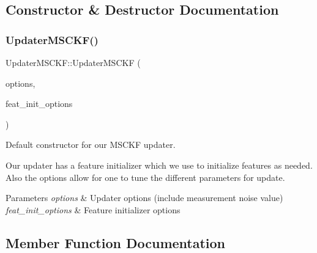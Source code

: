 \subsection{Constructor \& Destructor Documentation}
\mbox{\label{classov__msckf_1_1UpdaterMSCKF_af8d2ffc21b0209319c7fd9a351b9d3ad}} 
\subsubsection{\texorpdfstring{Updater\+M\+S\+C\+K\+F()}{UpdaterMSCKF()}}
{\footnotesize\ttfamily Updater\+M\+S\+C\+K\+F\+::\+Updater\+M\+S\+C\+KF (\begin{DoxyParamCaption}\item[{\hyperlink{structov__msckf_1_1UpdaterOptions}{Updater\+Options} \&}]{options,  }\item[{\hyperlink{structov__core_1_1FeatureInitializerOptions}{ov\+\_\+core\+::\+Feature\+Initializer\+Options} \&}]{feat\+\_\+init\+\_\+options }\end{DoxyParamCaption})}



Default constructor for our M\+S\+C\+KF updater. 

Our updater has a feature initializer which we use to initialize features as needed. Also the options allow for one to tune the different parameters for update.


\begin{DoxyParams}{Parameters}
{\em options} & Updater options (include measurement noise value) \\
\hline
{\em feat\+\_\+init\+\_\+options} & Feature initializer options \\
\hline
\end{DoxyParams}


\subsection{Member Function Documentation}
\mbox{\label{classov__msckf_1_1UpdaterMSCKF_a4f307c56582c5fefeef298c5b54da2fd}} 
